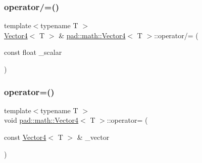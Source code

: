 \mbox{\label{structpad_1_1math_1_1_vector4_a3703b229047d4cd251215a409c8ad7a5}} 
\subsubsection{\texorpdfstring{operator/=()}{operator/=()}}
{\footnotesize\ttfamily template$<$typename T $>$ \\
\mbox{\hyperlink{structpad_1_1math_1_1_vector4}{Vector4}}$<$ T $>$ \& \mbox{\hyperlink{structpad_1_1math_1_1_vector4}{pad\+::math\+::\+Vector4}}$<$ T $>$\+::operator/= (\begin{DoxyParamCaption}\item[{const float}]{\+\_\+scalar }\end{DoxyParamCaption})}

\mbox{\label{structpad_1_1math_1_1_vector4_ac705833566aae9930fa13586833a535b}} 
\subsubsection{\texorpdfstring{operator=()}{operator=()}\hspace{0.1cm}{\footnotesize\ttfamily [1/2]}}
{\footnotesize\ttfamily template$<$typename T $>$ \\
void \mbox{\hyperlink{structpad_1_1math_1_1_vector4}{pad\+::math\+::\+Vector4}}$<$ T $>$\+::operator= (\begin{DoxyParamCaption}\item[{const \mbox{\hyperlink{structpad_1_1math_1_1_vector4}{Vector4}}$<$ T $>$ \&}]{\+\_\+vector }\end{DoxyParamCaption})}

\mbox{\label{structpad_1_1math_1_1_vector4_aa8541807bf5c8c3a0b5edb851feb858a}} 
